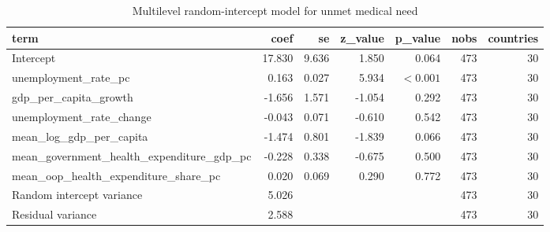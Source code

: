 \begin{table}
\caption{Multilevel random-intercept model for unmet medical need}
\label{tab:regression_multilevel}
\begin{tabular}{lrrrrrr}
\toprule
term & coef & se & z\_value & p\_value & nobs & countries \\
\midrule
Intercept & 17.830 & 9.636 & 1.850 & 0.064 & 473 & 30 \\
unemployment\_rate\_pc & 0.163 & 0.027 & 5.934 & \(<0.001\) & 473 & 30 \\
gdp\_per\_capita\_growth & -1.656 & 1.571 & -1.054 & 0.292 & 473 & 30 \\
unemployment\_rate\_change & -0.043 & 0.071 & -0.610 & 0.542 & 473 & 30 \\
mean\_log\_gdp\_per\_capita & -1.474 & 0.801 & -1.839 & 0.066 & 473 & 30 \\
mean\_government\_health\_expenditure\_gdp\_pc & -0.228 & 0.338 & -0.675 & 0.500 & 473 & 30 \\
mean\_oop\_health\_expenditure\_share\_pc & 0.020 & 0.069 & 0.290 & 0.772 & 473 & 30 \\
Random intercept variance & 5.026 &  &  &  & 473 & 30 \\
Residual variance & 2.588 &  &  &  & 473 & 30 \\
\bottomrule
\end{tabular}
\end{table}
